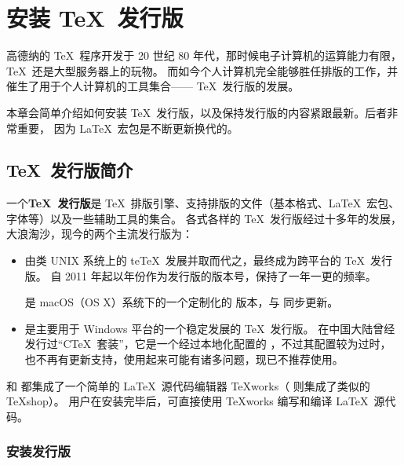 \chapter{安装 \protect\TeX\ 发行版}\label{app:install}

\begin{intro}
高德纳的 \TeX\ 程序开发于 20 世纪 80 年代，那时候电子计算机的运算能力有限，\TeX\ 还是大型服务器上的玩物。
而如今个人计算机完全能够胜任排版的工作，并催生了用于个人计算机的工具集合—— \TeX\ 发行版的发展。

本章会简单介绍如何安装 \TeX\ 发行版，以及保持发行版的内容紧跟最新。后者非常重要，
因为 \LaTeX\ 宏包是不断更新换代的。
\end{intro}

\section{\protect\TeX\ 发行版简介}\label{sec:dists}

一个\textbf{\TeX\ 发行版}是 \TeX\ 排版引擎、支持排版的文件（基本格式、\LaTeX\ 宏包、字体等）以及一些辅助工具的集合。
各式各样的 \TeX\ 发行版经过十多年的发展，大浪淘沙，现今的两个主流发行版为：
\begin{itemize}
  \item \textbf{}\par
   由类 UNIX 系统上的 te\TeX\ 发展并取而代之，最终成为跨平台的 \TeX\ 发行版。
   自 2011 年起以年份作为发行版的版本号，保持了一年一更的频率。

   是 macOS（OS X）系统下的一个定制化的  版本，与  同步更新。

  \item \textbf{}\par
   是主要用于 Windows 平台的一个稳定发展的 \TeX\ 发行版。
  在中国大陆曾经发行过“C\TeX\ 套装”，它是一个经过本地化配置的 ，不过其配置较为过时，也不再有更新支持，使用起来可能有诸多问题，现已不推荐使用。
\end{itemize}

 和  都集成了一个简单的 \LaTeX\ 源代码编辑器 \TeX works（ 则集成了类似的 \TeX shop）。
用户在安装完毕后，可直接使用 \TeX works 编写和编译 \LaTeX\ 源代码。

\subsection{安装发行版}\label{subsec:install-dists}

